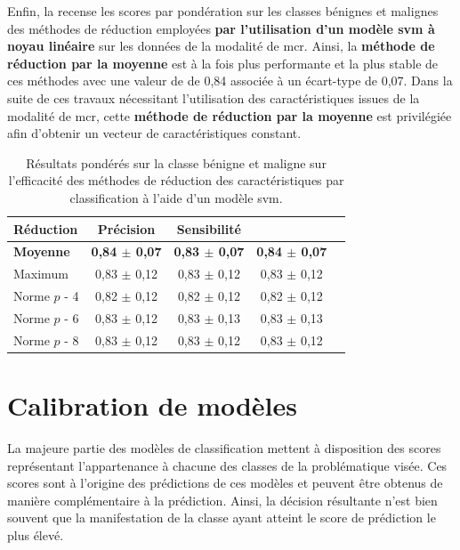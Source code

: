 Enfin, la  recense les scores par pondération sur les classes bénignes et malignes des méthodes de réduction employées \textbf{par l'utilisation d'un modèle \gls{svm} à noyau linéaire} sur les données de la modalité de \gls{mcr}. Ainsi, la \textbf{méthode de réduction par la moyenne} est à la fois plus performante et la plus stable de ces méthodes avec une valeur de \fscore{} de 0,84 associée à un écart-type de 0,07. Dans la suite de ces travaux nécessitant l'utilisation des caractéristiques issues de la modalité de \gls{mcr}, cette \textbf{méthode de réduction par la moyenne} est privilégiée afin d'obtenir un vecteur de caractéristiques constant.\par

\begin{table}[H]
    \centering
    \begin{tabular}{lcccc} \toprule
        Réduction           & Précision                 & Sensibilité               & \Fscore{}                 \\ \midrule
        \textbf{Moyenne}    & \textbf{0,84 $\pm$ 0,07}  & \textbf{0,83 $\pm$ 0,07}  & \textbf{0,84 $\pm$ 0,07}  \\
        Maximum             & 0,83 $\pm$ 0,12           & 0,83 $\pm$ 0,12           & 0,83 $\pm$ 0,12           \\
        Norme $p$ - 4       & 0,82 $\pm$ 0,12           & 0,82 $\pm$ 0,12           & 0,82 $\pm$ 0,12           \\
        Norme $p$ - 6       & 0,83 $\pm$ 0,12           & 0,83 $\pm$ 0,13           & 0,83 $\pm$ 0,13           \\
        Norme $p$ - 8       & 0,83 $\pm$ 0,12           & 0,83 $\pm$ 0,12           & 0,83 $\pm$ 0,12           \\ \bottomrule
    \end{tabular}
    \caption{Résultats pondérés sur la classe bénigne et maligne sur l'efficacité des méthodes de réduction des caractéristiques par classification à l'aide d'un modèle \gls{svm}.}
    \label{tab:results_multimodality_weighted_microscopy}
\end{table}

\clearpage

\section{Calibration de modèles}
\label{sec:calibrate_models}
La majeure partie des modèles de classification mettent à disposition des scores représentant l'appartenance à chacune des classes de la problématique visée. Ces scores sont à l'origine des prédictions de ces modèles et peuvent être obtenus de manière complémentaire à la prédiction. Ainsi, la décision résultante n'est bien souvent que la manifestation de la classe ayant atteint le score de prédiction le plus élevé.\par

